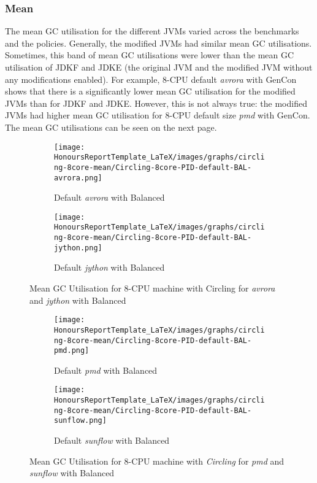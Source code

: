 \subsubsection{Mean}
The mean GC utilisation for the different JVMs varied across the
benchmarks and the policies. Generally, the modified JVMs had similar
mean GC utilisations. Sometimes, this band of mean GC utilisations were
lower than the mean GC utilisation of JDKF and JDKE (the original JVM
and the modified JVM without any modifications enabled). For example,
8-CPU default \emph{avrora} with GenCon shows that there is a significantly
lower mean GC utilisation for the modified JVMs than for JDKF and JDKE.
However, this is not always true: the modified JVMs had higher mean GC
utilisation for 8-CPU default size \emph{pmd} with GenCon. The mean GC utilisations can be seen on the next page.
\newpage
\begin{figure} [H]
\begin{subfigure}{1\textwidth}
\texttt{[image: HonoursReportTemplate\_LaTeX/images/graphs/circling-8core-mean/Circling-8core-PID-default-BAL-avrora.png]}
\caption{Default \emph{avrora} with Balanced}
\label{fig:circling-mean-01}
\end{subfigure}
\begin{subfigure}{1\textwidth}
\texttt{[image: HonoursReportTemplate\_LaTeX/images/graphs/circling-8core-mean/Circling-8core-PID-default-BAL-jython.png]}
\caption{Default \emph{jython} with Balanced}
\label{fig:circling-mean-02}
\end{subfigure}
\caption{Mean GC Utilisation for 8-CPU machine with Circling for \emph{avrora} and \emph{jython} with Balanced}
\end{figure}
\newpage
\begin{figure} [H]
\begin{subfigure}{1\textwidth}
\texttt{[image: HonoursReportTemplate\_LaTeX/images/graphs/circling-8core-mean/Circling-8core-PID-default-BAL-pmd.png]}
\caption{Default \emph{pmd} with Balanced}
\label{fig:circling-mean-03}
\end{subfigure}
\begin{subfigure}{1\textwidth}
\texttt{[image: HonoursReportTemplate\_LaTeX/images/graphs/circling-8core-mean/Circling-8core-PID-default-BAL-sunflow.png]}
\caption{Default \emph{sunflow} with Balanced}
\label{fig:circling-mean-04}
\end{subfigure}
\caption{Mean GC Utilisation for 8-CPU machine with \emph{Circling} for \emph{pmd} and \emph{sunflow} with Balanced}
\end{figure}
